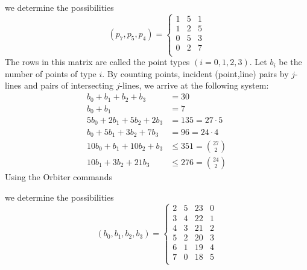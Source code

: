 we determine the possibilities 
$$
(p_7,p_5,p_4) = \left\{
\begin{array}{ccc}
1 & 5 & 1 \\
1 & 2 & 5 \\
0 & 5 & 3 \\
0 & 2 & 7 \\
\end{array}
\right.
$$
The rows in this matrix are called the point types $(i=0,1,2,3).$
Let $b_i$ be the number of points of type  $i.$
By counting points, incident (point,line) pairs by $j$-lines 
and pairs of intersecting $j$-lines, we arrive at the following system:
\begin{align*}
	b_0 + b_1 + b_2 + b_3 & = 30 \\
	b_0 + b_1 & = 7\\
	5b_0 + 2b_1 + 5b_2 + 2b_3 &= 135 = 27 \cdot 5\\
	b_0 + 5b_1+3b_2+7b_3 & = 96 = 24 \cdot 4\\
	10b_0 + b_1 + 10b_2 + b_3 & \le 351 = {27 \choose 2}\\
	10b_1+3b_2+21b_3 & \le 276 = {24 \choose 2}
\end{align*}
Using the Orbiter commands 


we determine the possibilities 
$$
(b_0,b_1,b_2,b_3) = \left\{
\begin{array}{cccc}
2 &5 &23 &0 \\
3 &4 &22 &1 \\
4 &3 &21 &2 \\
5 &2 &20 &3 \\
6 &1 &19 &4 \\
7 &0 &18 &5 \\
\end{array}
\right.
$$

